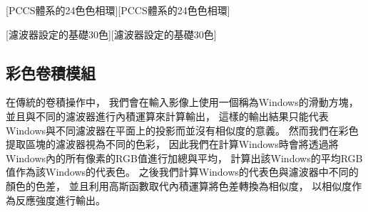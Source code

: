 \documentclass[class=NCU_thesis, crop=false]{standalone}
\begin{document}
	[PCCS體系的24色色相環\cite{PCCScite}][PCCS體系的24色色相環]

	[濾波器設定的基礎30色][濾波器設定的基礎30色]

	\subsection{彩色卷積模組}
	在傳統的卷積操作中，
	我們會在輸入影像上使用一個稱為Windows的滑動方塊，
	並且與不同的濾波器進行內積運算來計算輸出，
	這樣的輸出結果只能代表Windows與不同濾波器在平面上的投影而並沒有相似度的意義。
	然而我們在彩色提取區塊的濾波器視為不同的色彩，
	因此我們在計算Windows時會將透過將Windows內的所有像素的RGB值進行加總與平均，
	計算出該Windows的平均RGB值作為該Windows的代表色。
	之後我們計算Windows的代表色與濾波器中不同的顏色的色差，
	並且利用高斯函數取代內積運算將色差轉換為相似度，
	以相似度作為反應強度進行輸出。
\end{document}
